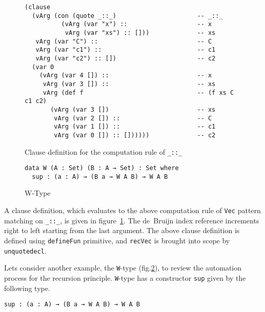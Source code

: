 \documentclass[sigplan,10pt]{acmart}
\begin{document}
\begin{figure}
\begin{center}
\begingroup
\fontsize{7pt}{9pt}\selectfont
\begin{Verbatim}
(clause
  (vArg (con (quote _::_)                      -- _::_
          (vArg (var "x") ::                   -- x
           vArg (var "xs") :: []))             -- xs
   vArg (var "C") ::                           -- C
   vArg (var "c1") ::                          -- c1
   vArg (var "c2") :: [])                      -- c2
  (var 0                                       
    (vArg (var 4 []) ::                        -- x
     vArg (var 3 []) ::                        -- xs
     vArg (def f                               -- (f xs C c1 c2)
       (vArg (var 3 [])                        -- xs
        vArg (var 2 []) ::                     -- C
        vArg (var 1 []) ::                     -- c1
        vArg (var 0 []) :: [])))))             -- c2

\end{Verbatim}
\endgroup
\end{center}
\caption{Clause definition for the computation rule of \texttt{\_::\_}}
\label{fig:ast-cdef}
\end{figure}
\normalsize

\begin{figure}
\begin{center}
\begin{BVerbatim}
data W (A : Set) (B : A → Set) : Set where
  sup : (a : A) → (B a → W A B) → W A B
\end{BVerbatim}
\end{center}
\caption{W-Type}
\label{fig:W-type}
\end{figure}

A clause definition, which evaluates to the above computation rule of {\tt Vec} pattern matching on {\tt \_::\_}, is given in figure~\ref{fig:ast-cdef}. The de~Bruijn index reference increments right to left starting from the last argument.  The above clause definition is defined using {\tt defineFun} primitive, and \texttt{recVec} is brought into scope by {\tt unquotedecl}.

Lets consider another example, the {\tt W}-type (fig.\ref{fig:W-type}), to review the automation process for the recursion principle. {\tt W}-type has a constructor {\tt sup} given by the following type.

\begin{center}
\begingroup
\begin{BVerbatim}
sup : (a : A) → (B a → W A B) → W A B
\end{BVerbatim}
\endgroup
\end{center}
\end{document}
